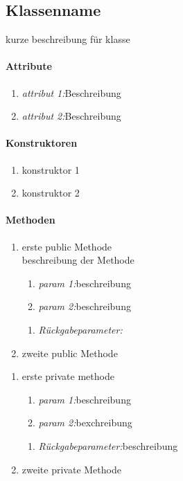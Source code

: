 \subsection{Klassenname}
kurze beschreibung für klasse

\paragraph{Attribute}
\begin{enumerate}[$\bullet$]
\item \textit{attribut 1:}Beschreibung
\item \textit{attribut 2:}Beschreibung
\end{enumerate}

\paragraph{Konstruktoren}
\begin{enumerate}[+]
\item konstruktor 1
\item konstruktor 2
\end{enumerate}

\paragraph{Methoden}

\begin{enumerate}[+]
\item erste public Methode\\
beschreibung der Methode

\begin{enumerate}[$\bullet$]
\item \textit{param 1:}beschreibung
\item \textit{param 2:}beschreibung
\end{enumerate}
\vspace{-0.2cm}
\begin{enumerate}[$\circ$]
\item \textit{Rückgabeparameter:}
\end{enumerate}

\item zweite public Methode
\end{enumerate}

\begin{enumerate}[$-$]
\item erste private methode

\begin{enumerate}[$\bullet$]
\item \textit{param 1:}beschreibung
\item \textit{param 2:}bexchreibung
\end{enumerate}
\vspace{-0.2cm}
\begin{enumerate}[$\circ$]
\item \textit{Rückgabeparameter:}beschreibung
\end{enumerate}

\item zweite private Methode
\end{enumerate}